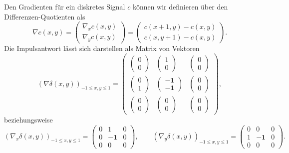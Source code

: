 \begin{example}
\begin{description}
  Den Gradienten für ein diskretes Signal $ c $ können wir definieren über den
  Differenzen-Quotienten als
  \[
      \nabla c(x,y)
    = \begin{pmatrix}
        \nabla_{x} c(x,y) \\
        \nabla_{y} c(x,y)
      \end{pmatrix}
    = \begin{pmatrix}
        c(x + 1, y) - c(x, y) \\
        c(x, y + 1) - c(x, y)
      \end{pmatrix}.
  \]
  Die Impulsantwort lässt sich darstellen als Matrix von Vektoren
  \[
      \left( \nabla \delta(x,y) \right)_{-1 \leq x,y \leq 1}
    = \begin{pmatrix}
        \begin{pmatrix} 0 \\ 0 \end{pmatrix} &
        \begin{pmatrix} 1 \\ 0 \end{pmatrix} & 
        \begin{pmatrix} 0 \\ 0 \end{pmatrix} \\[1em]
        \begin{pmatrix} 0 \\ 1 \end{pmatrix} &
        \begin{pmatrix} \mathbf{-1} \\ \mathbf{-1} \end{pmatrix} &
        \begin{pmatrix} 0 \\ 0 \end{pmatrix} \\[1em]
        \begin{pmatrix} 0 \\ 0 \end{pmatrix} &
        \begin{pmatrix} 0 \\ 0 \end{pmatrix} &
        \begin{pmatrix} 0 \\ 0 \end{pmatrix}
      \end{pmatrix},
  \]
  beziehungsweise
  \[
      \left( \nabla_{x} \delta(x,y) \right)_{-1 \leq x,y \leq 1}
    = \begin{pmatrix}
        0 & 1 & 0 \\
        0 & \mathbf{-1} & 0 \\
        0 & 0 & 0
      \end{pmatrix}, \qquad
      \left( \nabla_{y} \delta(x,y) \right)_{-1 \leq x,y \leq 1}
    = \begin{pmatrix}
        0 & 0 & 0 \\
        1 & \mathbf{-1} & 0 \\
        0 & 0 & 0
      \end{pmatrix}.
  \]


\end{description}
\end{example}

